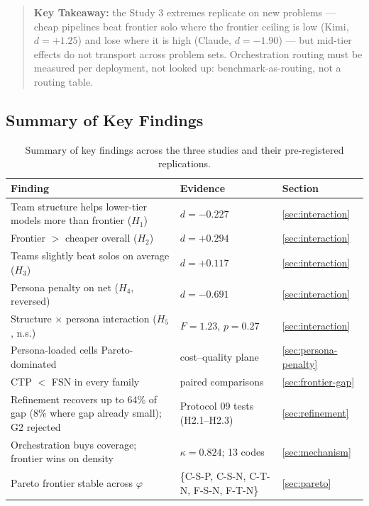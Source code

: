 \documentclass[12pt,a4paper]{article}
\newcommand{\phiBlend}{\varphi}
\begin{document}
\begin{quote}
\textbf{Key Takeaway:} the Study 3 extremes replicate on new problems ---
cheap pipelines beat frontier solo where the frontier ceiling is low (Kimi,
$d = +1.25$) and lose where it is high (Claude, $d = -1.90$) --- but
mid-tier effects do not transport across problem sets. Orchestration routing
must be measured per deployment, not looked up: benchmark-as-routing, not a
routing table.
\end{quote}

\subsection{Summary of Key Findings}

\begin{table}[ht]
  \centering
  \footnotesize
  \caption{Summary of key findings across the three studies and their
  pre-registered replications.}
  \label{tab:summary-findings}
  \begin{tabular}{@{}>{\raggedright\arraybackslash}p{7.6cm} >{\raggedright\arraybackslash}p{4.6cm} >{\raggedright\arraybackslash}p{2.2cm}@{}}
    \toprule
    \textbf{Finding} & \textbf{Evidence} & \textbf{Section} \\
    \midrule
    Team structure helps lower-tier models more than frontier ($H_1$) & $d = -0.227$ & \cref{sec:interaction} \\
    Frontier $>$ cheaper overall ($H_2$) & $d = +0.294$ & \cref{sec:interaction} \\
    Teams slightly beat solos on average ($H_3$) & $d = +0.117$ & \cref{sec:interaction} \\
    Persona penalty on net ($H_4$, reversed) & $d = -0.691$ & \cref{sec:interaction} \\
    Structure $\times$ persona interaction ($H_5$, n.s.) & $F = 1.23$, $p = 0.27$ & \cref{sec:interaction} \\
    Persona-loaded cells Pareto-dominated & cost--quality plane & \cref{sec:persona-penalty} \\
    CTP $<$ FSN in every family & paired comparisons & \cref{sec:frontier-gap} \\
    Refinement recovers up to 64\% of gap (8\% where gap already small); G2 rejected & Protocol 09 tests (H2.1--H2.3) & \cref{sec:refinement} \\
    Orchestration buys coverage; frontier wins on density & $\kappa = 0.824$; 13 codes & \cref{sec:mechanism} \\
    Pareto frontier stable across $\phiBlend$ & \{C-S-P, C-S-N, C-T-N, F-S-N, F-T-N\} & \cref{sec:pareto} \\

\end{tabular}
\end{table}
\end{document}
